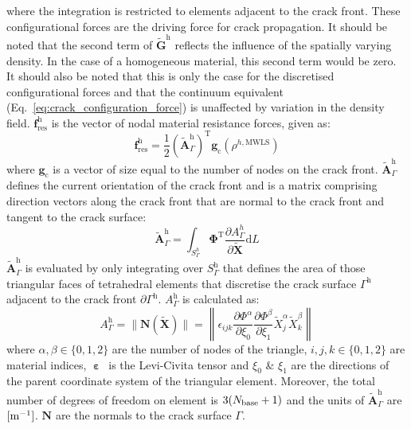 \documentclass[onecolumn]{svjour3}
\begin{document}
where the integration is restricted to elements adjacent to the crack front.
These configurational forces are the driving force for crack propagation. It should be noted that the second term of $\tilde{\mathbf{G}}^\textrm{h}$ reflects the influence of the spatially varying density. In the case of a homogeneous material, this second term would be zero. It should also be noted that this is only the case for the discretised configurational forces and that the continuum equivalent (Eq.~\ref{eq:crack_configuration_force}) is unaffected by variation in the density field.
% 
$\mathbf{f}^\textrm{h}_\textrm{res}$ is the vector of nodal material resistance forces, given as:
\begin{equation}
\mathbf{f}^\textrm{h}_\textrm{res}=\frac{1}{2}\left(\tilde{\mathbf{A}}_\Gamma^\textrm{h}\right)^\textrm{T}\mathbf{g}_\textrm{c}(\rho^{h,\textrm{MWLS}})
\end{equation}
where $\mathbf{g}_\textrm{c}$ is a vector of size equal to the number of nodes on the crack front. $\tilde{\mathbf{A}}_\Gamma^\textrm{h}$ defines the current orientation of the crack front and is a matrix comprising direction vectors along the crack front that are normal to the crack front and tangent to the crack surface:
\begin{equation}
\tilde{\mathbf{A}}_\Gamma^\textrm{h} = 
\int_{S^h_\Gamma}
\pmb{\Phi}^\textrm{T} 
\frac{\partial {A}^h_{\Gamma}}{
\partial \tilde{\mathbf{X}}}
\textrm{d}L
\end{equation}
$\tilde{\mathbf{A}}_\Gamma^\textrm{h}$ is evaluated by only integrating over $S_\Gamma^\textrm{h}$ that defines the area of those triangular faces of tetrahedral elements that discretise the crack surface $\Gamma^\textrm{h}$ adjacent to the crack front $\partial\Gamma^\textrm{h}$.
$A^\textrm{h}_{\Gamma}$ is calculated as:
\begin{equation}
A^\textrm{h}_{\Gamma} = 	
	\| \mathbf{N}(\tilde{\mathbf{X}}) \|
=
\left\| 
\epsilon_{ijk}
\frac{\partial \Phi^\alpha}{\partial \xi_0}  
\frac{\partial \Phi^\beta}{\partial \xi_1} 
\tilde{X}^\alpha_j
\tilde{X}^\beta_k
\right\|
\end{equation}
where $\alpha, \beta \in \{0, 1, 2\}$ are the number of nodes of the triangle,
$i,j,k \in \{0,1,2\}$ are material indices, $\boldsymbol{\upepsilon}$~is the Levi-Civita tensor and $\xi_0$ \& $\xi_1$ are the directions of the parent coordinate system of the triangular element. 
Moreover, the total number of degrees of freedom on element is $3(N_{\rm{base}}+1)$ and the units of $\tilde{\mathbf{A}}_\Gamma^\textrm{h}$ are $[{\rm m}^{-1}]$. $\mathbf{N}$ are the normals to the crack surface $\Gamma$.
\end{document}
